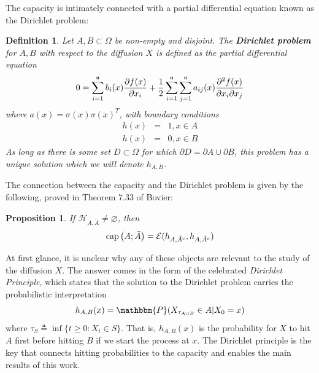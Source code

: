 \documentclass[english, aip, jcp, priprint, graphicx,floatfix]{revtex4-1}
\newtheorem{definition}{Definition}
\newtheorem{proposition}{Proposition}
\theoremstyle{plain}
\theoremstyle{definition}
\theoremstyle{plain}
\begin{document}
The capacity is intimately connected with a partial differential equation known as the Dirichlet problem:

\begin{definition}
Let $A, B \subset \Omega$ be non-empty and disjoint.  The \textbf{Dirichlet problem} for $A,B$ with respect to the diffusion $X$ is defined as the partial
differential equation
\[ 0 = \sum_{i = 1}^{\mathfrak{n}} b_i (x) \frac{\partial f
(x)}{\partial x_i} + \frac{1}{2} \sum_{i = 1}^{\mathfrak{n}} \sum_{j = 1}^{\mathfrak{n}} a_{ij} (x)
\frac{\partial^2 f (x)}{\partial x_i \partial x_j} \]
where $a(x)=\sigma(x)\sigma(x)^T$, with boundary conditions
\begin{eqnarray*}
h (x) & = & 1, x \in A\\
h (x) & = & 0, x \in B
\end{eqnarray*}
As long as there is some set $D \subset \Omega$ for which $\partial D = \partial A \cup \partial B$, this problem has a unique solution which we will denote $h_{A,B}$.
\end{definition}

The connection between the capacity and the Dirichlet problem is given by the following, proved in Theorem 7.33 of Bovier:\cite{Bovier2016-ez}

\begin{proposition}\label{prop:capacitydirichlet}
If $\mathcal{H}_{A, \tilde{A}} \neq \varnothing$, then
\[
\mathrm{cap}\left(A;\tilde{A}\right) = \mathcal{E} (h_{A,\tilde{A}^c}, h_{A, \tilde{A}^c})
\]
\end{proposition}

At first glance, it is unclear why any of these objects are relevant to the study of the diffusion $X$.  The answer comes in the form of the celebrated {\itshape{Dirichlet Principle}}, which states that the solution to the Dirichlet problem carries the probabilistic interpretation 
\[ h_{A, B} (x) =\mathbbm{P} (X_{\tau_{A \cup B}} \in A|X_0 = x) \]
where $\tau_S \triangleq \inf \{ t \geqslant 0 : X_t \in S \}$.  That is, $h_{A, B} (x)$ is the probability for $X$ to hit $A$ first before hitting $B$ if we start the process at $x$.  The Dirichlet principle is the key that connects hitting probabilities to the capacity and enables the main results of this work.


                                                       
\end{document}
